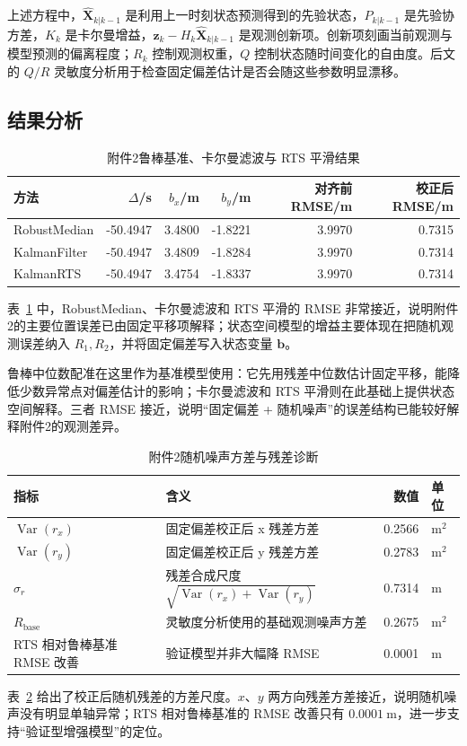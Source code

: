 \documentclass{cumcmthesis}
\begin{document}
上述方程中，$\hat{\bm X}_{k|k-1}$ 是利用上一时刻状态预测得到的先验状态，$P_{k|k-1}$ 是先验协方差，$K_k$ 是卡尔曼增益，$\bm z_k-H_k\hat{\bm X}_{k|k-1}$ 是观测创新项。创新项刻画当前观测与模型预测的偏离程度；$R_k$ 控制观测权重，$Q$ 控制状态随时间变化的自由度。后文的 $Q/R$ 灵敏度分析用于检查固定偏差估计是否会随这些参数明显漂移。

\subsection{结果分析}
\begin{table}[H]
  \centering
  \caption{附件2鲁棒基准、卡尔曼滤波与 RTS 平滑结果}
  \label{tab:kalman_compare}
  \small
  \begin{tabular}{lrrrrr}
    \toprule
    方法 & $\Delta$/s & $b_x$/m & $b_y$/m & 对齐前RMSE/m & 校正后RMSE/m\\
    \midrule
    RobustMedian & -50.4947 & 3.4800 & -1.8221 & 3.9970 & 0.7315\\
    KalmanFilter & -50.4947 & 3.4809 & -1.8284 & 3.9970 & 0.7314\\
    KalmanRTS & -50.4947 & 3.4754 & -1.8337 & 3.9970 & 0.7314\\
    \bottomrule
  \end{tabular}
\end{table}
表~\ref{tab:kalman_compare} 中，RobustMedian、卡尔曼滤波和 RTS 平滑的 RMSE 非常接近，说明附件2的主要位置误差已由固定平移项解释；状态空间模型的增益主要体现在把随机观测误差纳入 $R_1,R_2$，并将固定偏差写入状态变量 $\bm b$。

鲁棒中位数配准在这里作为基准模型使用：它先用残差中位数估计固定平移，能降低少数异常点对偏差估计的影响；卡尔曼滤波和 RTS 平滑则在此基础上提供状态空间解释。三者 RMSE 接近，说明“固定偏差 + 随机噪声”的误差结构已能较好解释附件2的观测差异。

\begin{table}[H]
  \centering
  \caption{附件2随机噪声方差与残差诊断}
  \label{tab:noise_diag}
  \small
  \begin{tabular}{llrl}
    \toprule
    指标 & 含义 & 数值 & 单位\\
    \midrule
    $\operatorname{Var}(r_x)$ & 固定偏差校正后 x 残差方差 & 0.2566 & $\mathrm{m^2}$\\
    $\operatorname{Var}(r_y)$ & 固定偏差校正后 y 残差方差 & 0.2783 & $\mathrm{m^2}$\\
    $\sigma_r$ & 残差合成尺度 $\sqrt{\operatorname{Var}(r_x)+\operatorname{Var}(r_y)}$ & 0.7314 & m\\
    $R_{\mathrm{base}}$ & 灵敏度分析使用的基础观测噪声方差 & 0.2675 & $\mathrm{m^2}$\\
    RTS 相对鲁棒基准 RMSE 改善 & 验证模型并非大幅降 RMSE & 0.0001 & m\\
    \bottomrule
  \end{tabular}
\end{table}
表~\ref{tab:noise_diag} 给出了校正后随机残差的方差尺度。$x$、$y$ 两方向残差方差接近，说明随机噪声没有明显单轴异常；RTS 相对鲁棒基准的 RMSE 改善只有 $0.0001\ \mathrm{m}$，进一步支持“验证型增强模型”的定位。
\end{document}
